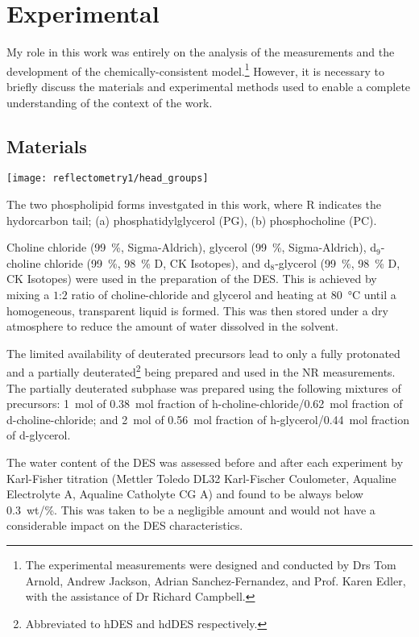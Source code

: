 \section{Experimental}
My role in this work was entirely on the analysis of the measurements and the development of the chemically-consistent model.\footnote{The experimental measurements were designed and conducted by Drs Tom Arnold, Andrew Jackson, Adrian Sanchez-Fernandez, and Prof. Karen Edler, with the assistance of Dr Richard Campbell.}
However, it is necessary to briefly discuss the materials and experimental methods used to enable a complete understanding of the context of the work.

\subsection{Materials}
%
\begin{marginfigure}
    \centering
    \texttt{[image: reflectometry1/head\_groups]}
    \caption{The two phospholipid forms investgated in this work, where R indicates the hydorcarbon tail; (a) phosphatidylglycerol (PG), (b) phosphocholine (PC).}
    \label{fig:heads}
\end{marginfigure}
%
Choline chloride (\SI{99}{\percent}, Sigma-Aldrich), glycerol (\SI{99}{\percent}, Sigma-Aldrich), d$_{9}$-choline chloride (\SI{99}{\percent}, \SI{98}{\percent} D, CK Isotopes), and d$_{8}$-glycerol (\SI{99}{\percent}, \SI{98}{\percent} D, CK Isotopes) were used in the preparation of the DES.
This is achieved by mixing a $1$:$2$ ratio of choline-chloride and glycerol and heating at \SI{80}{\celsius} until a homogeneous, transparent liquid is formed.\autocite{smith_deep_2014}
This was then stored under a dry atmosphere to reduce the amount of water dissolved in the solvent.

The limited availability of deuterated precursors lead to only a fully protonated and a partially deuterated\footnote{Abbreviated to hDES and hdDES respectively.} being prepared and used in the NR measurements.
The partially deuterated subphase was prepared using the following mixtures of precursors: \SI{1}{\mole} of \SI{0.38}{\mole} fraction of h-choline-chloride/\SI{0.62}{\mole} fraction of d-choline-chloride; and \SI{2}{\mole} of \SI{0.56}{\mole} fraction of h-glycerol/\SI{0.44}{\mole} fraction of d-glycerol.

The water content of the DES was assessed before and after each experiment by Karl-Fisher titration (Mettler Toledo DL32 Karl-Fischer Coulometer, Aqualine Electrolyte A, Aqualine Catholyte CG A) and found to be always below \SI{0.3}{wt/\percent}.
This was taken to be a negligible amount and would not have a considerable impact on the DES characteristics.\autocite{hammond_liquid_2016,hammond_resilience_2017}

